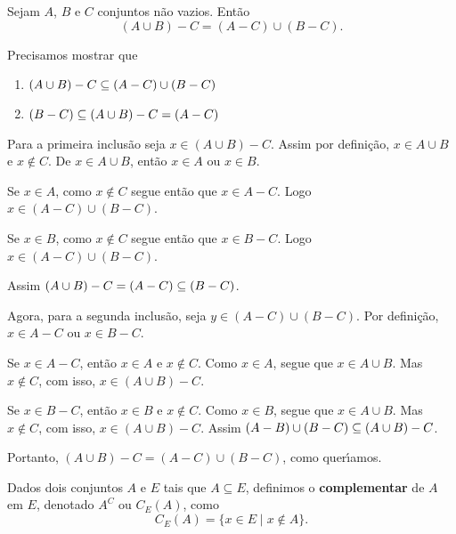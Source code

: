 \begin{proposicao}
	Sejam $A$, $B$ e $C$ conjuntos n\~ao vazios. Ent\~ao
	\[
		(A \cup B) - C = (A - C) \cup (B - C).
	\]
\end{proposicao}
\begin{prova}
	Precisamos mostrar que
	\begin{enumerate}[label={\arabic*})]
		\item $(A \cup B) - C \subseteq (A - C) \cup (B - C)$
		\item $(B - C) \subseteq (A \cup B) - C = (A - C)$
	\end{enumerate}
	Para a primeira inclus\~ao seja $x \in (A \cup B) - C$. Assim por defini\c{c}\~ao, $x \in A \cup B$ e $x \notin C$. De $x \in A \cup B$, ent\~ao $x \in A$ ou $x \in B$.

	Se $x \in A$, como $x \notin C$ segue ent\~ao que $x \in A - C$. Logo $x \in (A - C) \cup (B - C)$.

	Se $x \in B$, como $x \notin C$ segue ent\~ao que $x \in B - C$. Logo $x \in (A - C) \cup (B - C)$.

	Assim $(A \cup B) - C = (A - C) \subseteq (B - C)$.

	Agora, para a segunda inclus\~ao, seja $y \in (A - C) \cup (B - C)$. Por defini\c{c}\~ao, $x \in A - C$ ou $x \in B - C$.

	Se $x \in A - C$, ent\~ao $x \in A$ e $x \notin C$. Como $x \in A$, segue que $x \in A \cup B$. Mas $x \notin C$, com isso, $x \in (A \cup B) - C$.

	Se $x \in B - C$, ent\~ao $x \in B$ e $x \notin C$. Como $x \in B$, segue que $x \in A \cup B$. Mas $x \notin C$, com isso, $x \in (A \cup B) - C$.
	Assim $(A - B) \cup (B - C) \subseteq (A \cup B) - C$.

	Portanto, $(A \cup B) - C = (A - C) \cup (B - C)$, como quer{\'\i}amos.
\end{prova}

\begin{definicao}
    Dados dois conjuntos $A$ e $E$ tais que $A\subseteq E$, definimos o \textbf{complementar} de $A$ em $E$, denotado $A^C$ ou $C_E(A)$, como
    \[
	    C_E(A) = \{ x \in E \mid x \notin A \}.
    \]

\end{definicao}

